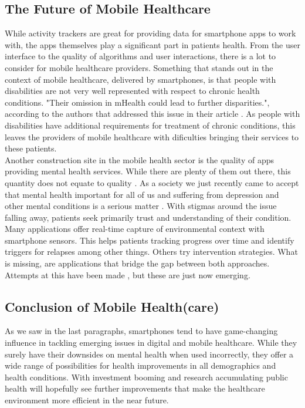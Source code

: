 \subsection{The Future of Mobile Healthcare}
While activity trackers are great for providing data for smartphone apps to work with, the apps themselves play a significant part in patients health. From the user interface to the quality of algorithms and user interactions, there is a lot to consider for mobile healthcare providers. Something that stands out in the context of mobile healthcare, delivered by smartphones, is that people with disabilities are not very well represented with respect to chronic health conditions. "Their omission in mHealth could lead to further disparities.", according to the authors that addressed this issue in their article \cite{jones2018mobile}. As people with disabilities have additional requirements for treatment of chronic conditions, this leaves the providers of mobile healthcare with dificulties bringing their services to these patients. \\
Another construction site in the mobile health sector is the quality of apps providing mental health services. While there are plenty of them out there, this quantity does not equate to quality \cite{torous2017needed}. As a society we just recently came to accept that mental health important for all of us and suffering from depression and other mental conditions is a serious matter \cite{bharadwaj2017mental}. With stigmas around the issue falling away, patients seek primarily trust and understanding of their condition. Many applications offer real-time capture of environmental context with smartphone sensors. This helps patients tracking progress over time and identify triggers for relapses among other things. Others try intervention strategies. What is missing, are applications that bridge the gap between both approaches. Attempts at this have been made \cite{torous2019creating}, but these are just now emerging.
\subsection{Conclusion of Mobile Health(care)}
As we saw in the last paragraphs, smartphones tend to have game-changing influence in tackling emerging issues in digital and mobile healthcare. While they surely have their downsides on mental health when used incorrectly, they offer a wide range of possibilities for health improvements in all demographics and health conditions. With investment booming \cite{safavi2019top} and research accumulating \cite{firth2016ecological} public health will hopefully see further improvements that make the healthcare environment more efficient in the near future.
